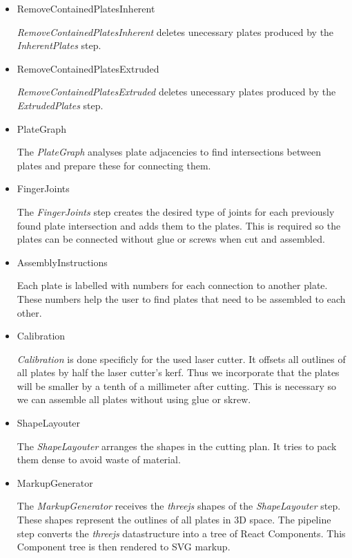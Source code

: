 \documentclass[../ClassicThesis.tex]{subfiles}
\begin{document}
\begin{itemize}
\item RemoveContainedPlatesInherent

\emph{RemoveContainedPlatesInherent} deletes unecessary plates produced by the \emph{InherentPlates} step.


\item RemoveContainedPlatesExtruded

\emph{RemoveContainedPlatesExtruded} deletes unecessary plates produced by the \emph{ExtrudedPlates} step.


\item PlateGraph

The \emph{PlateGraph} analyses plate adjacencies to find intersections between plates and prepare these for connecting them.

\item FingerJoints

The \emph{FingerJoints} step creates the desired type of joints for each previously found plate intersection and adds them to the plates. This is required so the plates can be connected without glue or screws when cut and assembled.


\item AssemblyInstructions

Each plate is labelled with numbers for each connection to another plate. These numbers help the user to find plates that need to be assembled to each other.


\item Calibration

\emph{Calibration} is done specificly for the used laser cutter. It offsets all outlines of all plates by half the laser cutter’s kerf. Thus we incorporate that the plates will be smaller by a tenth of a millimeter after cutting. This is necessary so we can assemble all plates without using glue or skrew.


\item ShapeLayouter

The \emph{ShapeLayouter} arranges the shapes in the cutting plan. It tries to pack them dense to avoid waste of material.


\item MarkupGenerator

The \emph{MarkupGenerator} receives the \emph{threejs} shapes of the \emph{ShapeLayouter} step. These shapes represent the outlines of all plates in 3D space. The pipeline step converts the \emph{threejs} datastructure into a tree of React Components. This Component tree is then rendered to SVG markup.



\end{itemize}
\end{document}
